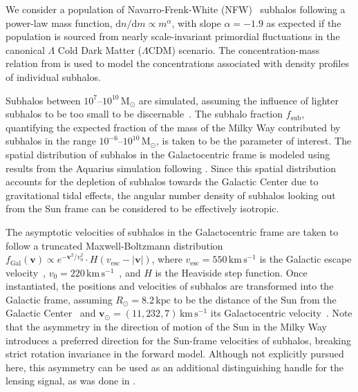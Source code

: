 \documentclass[twocolumn,linenumbers,anonymous]{aastex631}
\begin{document}
 We consider a population of Navarro-Frenk-White (NFW)~\citep{Navarro:1995iw} subhalos following a power-law mass function, $\mathrm dn / \mathrm dm \propto m^\alpha$, with slope $\alpha = -1.9$ as expected if the population is sourced from nearly scale-invariant primordial fluctuations in the canonical $\Lambda$ Cold Dark Matter ($\Lambda$CDM) scenario. The concentration-mass relation from \citet{Sanchez-Conde:2013yxa} is used to model the concentrations associated with density profiles of individual subhalos. 

Subhalos between $10^7$--$10^{10}\,\mathrm{M}_\odot$ are simulated, assuming the influence of lighter subhalos to be too small to be discernable~\citep{Mishra-Sharma:2020ynk}. The subhalo fraction $f_\mathrm{sub}$, quantifying the expected fraction of the mass of the Milky Way contributed by subhalos in the range $10^{-6}$--$10^{10}\,\mathrm{M}_\odot$, is taken to be the parameter of interest. The spatial distribution of subhalos in the Galactocentric frame is modeled using results from the Aquarius simulation following \citet{Hutten:2016jko,Springel:2008cc}. Since this spatial distribution accounts for the depletion of subhalos towards the Galactic Center due to gravitational tidal effects, the angular number density of subhalos looking out from the Sun frame can be considered to be effectively isotropic.

The asymptotic velocities of subhalos in the Galactocentric frame are taken to follow a truncated Maxwell-Boltzmann distribution~\citep{1939isss.book.....C,Lisanti:2016jxe} $f_{\mathrm{Gal}}(\mathbf{v})\propto e^{-\mathbf{v}^{2} / v_{0}^{2}}\cdot H(v_\mathrm{esc} - |\mathbf{v}|)$, where $v_\mathrm{esc} = 550\,\mathrm{km}\,\mathrm{s}^{-1}$ is the Galactic escape velocity~\citep{Piffl:2013mla}, $v_\mathrm{0} = 220\,\mathrm{km}\,\mathrm{s}^{-1}$~\citep{Kerr:1986hz}, and $H$ is the Heaviside step function. Once instantiated, the positions and velocities of subhalos are transformed into the Galactic frame, assuming $R_\odot = 8.2\,\mathrm{kpc}$ to be the distance of the Sun from the Galactic Center~\citep{2019A&A...625L..10G,2020arXiv201202169B} and $\mathbf{v}_{\odot} = (11, 232, 7)\,\mathrm{km}\,\mathrm{s}^{-1}$ its Galactocentric velocity~\citep{2010MNRAS.403.1829S}. Note that the asymmetry in the direction of motion of the Sun in the Milky Way introduces a preferred direction for the Sun-frame velocities of subhalos, breaking strict rotation invariance in the forward model. Although not explicitly pursued here, this asymmetry can be used as an additional distinguishing handle for the lensing signal, as was done in \citet{Mishra-Sharma:2020ynk}.
\end{document}
